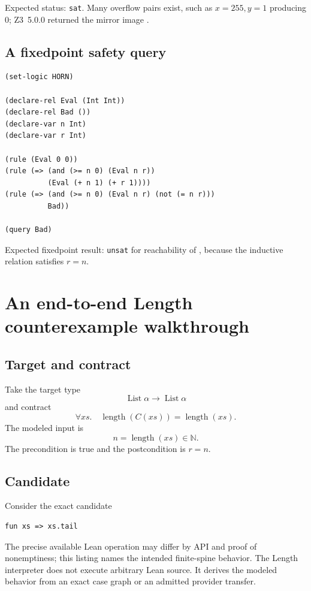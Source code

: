 \documentclass[10pt,letterpaper,oneside]{report}
\newcommand{\code}[1]{\texttt{\detokenize{#1}}}
\newcommand{\Nat}{\mathbb{N}}
\newcommand{\sat}{\texttt{sat}}
\newcommand{\unsat}{\texttt{unsat}}
\begin{document}
Expected status: \sat. Many overflow pairs exist, such as $x=255,y=1$ producing $0$; Z3~5.0.0 returned the mirror image \code{((x #x01) (y #xff) ((bvadd x y) #x00))}.

\section{A fixedpoint safety query}

\begin{lstlisting}[language=SMTLib]
(set-logic HORN)

(declare-rel Eval (Int Int))
(declare-rel Bad ())
(declare-var n Int)
(declare-var r Int)

(rule (Eval 0 0))
(rule (=> (and (>= n 0) (Eval n r))
          (Eval (+ n 1) (+ r 1))))
(rule (=> (and (>= n 0) (Eval n r) (not (= n r)))
          Bad))

(query Bad)
\end{lstlisting}

Expected fixedpoint result: \unsat{} for reachability of \code{Bad}, because the inductive relation satisfies $r=n$.

\chapter{An end-to-end Length counterexample walkthrough}
\label{app:length-walkthrough}

\section{Target and contract}

Take the target type
\[
  \operatorname{List}\alpha\to\operatorname{List}\alpha
\]
and contract
\[
  \forall xs.\quad
  \operatorname{length}(C(xs))=\operatorname{length}(xs).
\]
The modeled input is
\[
  n=\operatorname{length}(xs)\in\Nat.
\]
The precondition is true and the postcondition is $r=n$.

\section{Candidate}

Consider the exact candidate

\begin{lstlisting}[language=LeanX]
fun xs => xs.tail
\end{lstlisting}

The precise available Lean operation may differ by API and proof of nonemptiness; this listing names the intended finite-spine behavior. The Length interpreter does not execute arbitrary Lean source. It derives the modeled behavior from an exact case graph or an admitted provider transfer.
\end{document}
